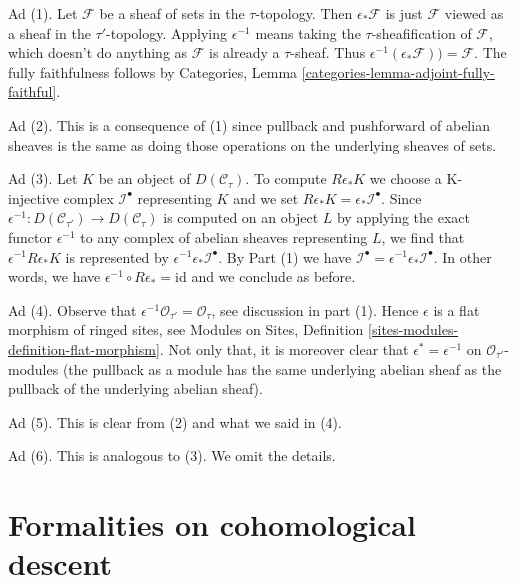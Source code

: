\medskip\noindent
Ad (1). Let $\mathcal{F}$ be a sheaf of sets in the $\tau$-topology.
Then $\epsilon_*\mathcal{F}$ is just $\mathcal{F}$ viewed as a sheaf
in the $\tau'$-topology. Applying $\epsilon^{-1}$ means taking the
$\tau$-sheafification of $\mathcal{F}$, which doesn't do anything
as $\mathcal{F}$ is already a $\tau$-sheaf. Thus
$\epsilon^{-1}(\epsilon_*\mathcal{F})) = \mathcal{F}$.
The fully faithfulness follows by Categories, Lemma
\ref{categories-lemma-adjoint-fully-faithful}.

\medskip\noindent
Ad (2). This is a consequence of (1) since pullback and pushforward
of abelian sheaves is the same as doing those operations on the underlying
sheaves of sets.

\medskip\noindent
Ad (3). Let $K$ be an object of $D(\mathcal{C}_\tau)$.
To compute $R\epsilon_*K$ we choose a K-injective
complex $\mathcal{I}^\bullet$ representing $K$
and we set $R\epsilon_*K = \epsilon_*\mathcal{I}^\bullet$.
Since $\epsilon^{-1} : D(\mathcal{C}_{\tau'}) \to D(\mathcal{C}_\tau)$
is computed on an object $L$ by applying the exact functor $\epsilon^{-1}$
to any complex of abelian sheaves representing $L$, we find that
$\epsilon^{-1}R\epsilon_*K$ is represented by
$\epsilon^{-1}\epsilon_*\mathcal{I}^\bullet$. By
Part (1) we have
$\mathcal{I}^\bullet = \epsilon^{-1}\epsilon_*\mathcal{I}^\bullet$.
In other words, we have $\epsilon^{-1} \circ R\epsilon_* = \text{id}$
and we conclude as before.

\medskip\noindent
Ad (4). Observe that $\epsilon^{-1}\mathcal{O}_{\tau'} = \mathcal{O}_\tau$, see
discussion in part (1). Hence $\epsilon$ is a flat morphism of ringed
sites, see
Modules on Sites, Definition \ref{sites-modules-definition-flat-morphism}.
Not only that, it is moreover clear that $\epsilon^* = \epsilon^{-1}$
on $\mathcal{O}_{\tau'}$-modules (the pullback as a module has the same
underlying abelian sheaf as the pullback of the underlying abelian sheaf).

\medskip\noindent
Ad (5). This is clear from (2) and what we said in (4).

\medskip\noindent
Ad (6). This is analogous to (3). We omit the details.












\section{Formalities on cohomological descent}
\label{section-formal-cohomological-descent}

